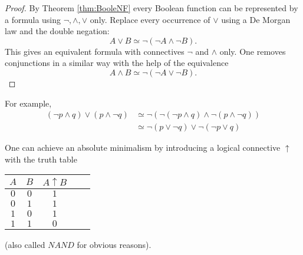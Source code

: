 \begin{proof}
By Theorem \ref{thm:BooleNF} every Boolean function can be represented by a formula using $\neg, \wedge, \vee$ only.
Replace every occurrence of $\vee$ using a De Morgan law and the double negation:
\[
A \vee B \simeq \neg(\neg A \wedge \neg B).
\]
This gives an equivalent formula with connectives $\neg$ and $\wedge$ only.
One removes conjunctions in a similar way with the help of the equivalence
\[
A \wedge B \simeq \neg (\neg A \vee \neg B).
\]
\end{proof}

For example,
\begin{align*}
(\neg p \wedge q) \vee (p \wedge \neg q) &\simeq \neg(\neg(\neg p \wedge q) \wedge \neg (p \wedge \neg q))\\
&\simeq \neg(p \vee \neg q) \vee \neg(\neg p \vee q)
\end{align*}

One can achieve an absolute minimalism by introducing a logical connective $\uparrow$ with the truth table
\begin{center}
\begin{tabular}{|c|c||c|c|c|}
\hline
$A$ & $B$ & $A \uparrow B$\\\hline
$0$ & $0$ & $1$\\\hline
$0$ & $1$ & $1$\\\hline
$1$ & $0$ & $1$\\\hline
$1$ & $1$ & $0$\\\hline
\end{tabular}
\end{center}
(also called $NAND$ for obvious reasons).
